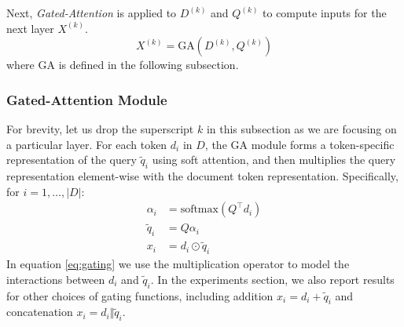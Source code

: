 \documentclass[11pt,a4paper]{article}
\begin{document}
Next, \textit{Gated-Attention} is applied to $D^{(k)}$ and $Q^{(k)}$ to compute inputs for the next layer $X^{(k)}$.
\begin{equation}
    X^{(k)} = \mathrm{GA}(D^{(k)}, Q^{(k)})
\end{equation}
where GA is defined in the following subsection.

\subsubsection{Gated-Attention Module}
For brevity,
let us drop the superscript $k$ in this subsection as we are focusing on a particular layer.
For each token $d_i$ in $D$,
the GA module forms a token-specific representation of the query $\tilde{q}_i$ using soft attention, and then multiplies the query representation element-wise with the document token representation. Specifically, for $i=1,\ldots,|D|$:
\begin{align}
    \alpha_i &= \text{softmax}(Q^\top d_i) \label{eq:q_att} \\
\tilde{q}_i &= Q\alpha_i \nonumber \\
x_i &= d_i \odot \tilde{q}_i
\label{eq:gating}
\end{align}
In equation \eqref{eq:gating} we use the multiplication operator
to model the interactions between $d_i$ and $\tilde{q}_i$.
In the experiments section,
we also report results for other choices of gating functions,
including addition $x_i = d_i + \tilde{q}_i$ and concatenation $x_i = d_i \Vert \tilde{q}_i$.


\end{document}
